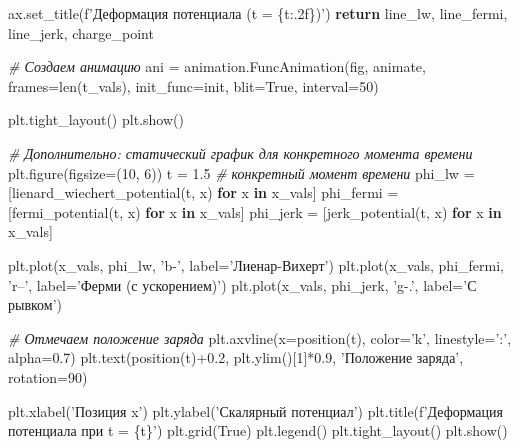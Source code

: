 \documentclass[11pt]{article}
\newenvironment{Shaded}{}{}
\newcommand{\KeywordTok}[1]{\textcolor[rgb]{0.00,0.44,0.13}{\textbf{{#1}}}}
\newcommand{\DecValTok}[1]{\textcolor[rgb]{0.25,0.63,0.44}{{#1}}}
\newcommand{\FloatTok}[1]{\textcolor[rgb]{0.25,0.63,0.44}{{#1}}}
\newcommand{\StringTok}[1]{\textcolor[rgb]{0.25,0.44,0.63}{{#1}}}
\newcommand{\CommentTok}[1]{\textcolor[rgb]{0.38,0.63,0.69}{\textit{{#1}}}}
\newcommand{\NormalTok}[1]{{#1}}
\newcommand{\SpecialCharTok}[1]{\textcolor[rgb]{0.25,0.44,0.63}{{#1}}}
\newcommand{\SpecialStringTok}[1]{\textcolor[rgb]{0.73,0.40,0.53}{{#1}}}
\newcommand{\VariableTok}[1]{\textcolor[rgb]{0.10,0.09,0.49}{{#1}}}
\newcommand{\ControlFlowTok}[1]{\textcolor[rgb]{0.00,0.44,0.13}{\textbf{{#1}}}}
\newcommand{\OperatorTok}[1]{\textcolor[rgb]{0.40,0.40,0.40}{{#1}}}
\newcommand{\BuiltInTok}[1]{{#1}}
\begin{document}
\begin{Shaded}
\begin{Highlighting}[]
\NormalTok{    ax.set_title(}\SpecialStringTok{f'Деформация потенциала (t = }\SpecialCharTok{\{t:.2f\}}\SpecialStringTok{)'}\NormalTok{)}
    \ControlFlowTok{return}\NormalTok{ line_lw, line_fermi, line_jerk, charge_point}

\CommentTok{# Создаем анимацию}
\NormalTok{ani }\OperatorTok{=}\NormalTok{ animation.FuncAnimation(fig, animate, frames}\OperatorTok{=}\BuiltInTok{len}\NormalTok{(t_vals),}
\NormalTok{                             init_func}\OperatorTok{=}\NormalTok{init, blit}\OperatorTok{=}\VariableTok{True}\NormalTok{, interval}\OperatorTok{=}\DecValTok{50}\NormalTok{)}

\NormalTok{plt.tight_layout()}
\NormalTok{plt.show()}

\CommentTok{# Дополнительно: статический график для конкретного момента времени}
\NormalTok{plt.figure(figsize}\OperatorTok{=}\NormalTok{(}\DecValTok{10}\NormalTok{, }\DecValTok{6}\NormalTok{))}
\NormalTok{t }\OperatorTok{=} \FloatTok{1.5}  \CommentTok{# конкретный момент времени}
\NormalTok{phi_lw }\OperatorTok{=}\NormalTok{ [lienard_wiechert_potential(t, x) }\ControlFlowTok{for}\NormalTok{ x }\KeywordTok{in}\NormalTok{ x_vals]}
\NormalTok{phi_fermi }\OperatorTok{=}\NormalTok{ [fermi_potential(t, x) }\ControlFlowTok{for}\NormalTok{ x }\KeywordTok{in}\NormalTok{ x_vals]}
\NormalTok{phi_jerk }\OperatorTok{=}\NormalTok{ [jerk_potential(t, x) }\ControlFlowTok{for}\NormalTok{ x }\KeywordTok{in}\NormalTok{ x_vals]}

\NormalTok{plt.plot(x_vals, phi_lw, }\StringTok{'b-'}\NormalTok{, label}\OperatorTok{=}\StringTok{'Лиенар-Вихерт'}\NormalTok{)}
\NormalTok{plt.plot(x_vals, phi_fermi, }\StringTok{'r--'}\NormalTok{, label}\OperatorTok{=}\StringTok{'Ферми (с ускорением)'}\NormalTok{)}
\NormalTok{plt.plot(x_vals, phi_jerk, }\StringTok{'g-.'}\NormalTok{, label}\OperatorTok{=}\StringTok{'С рывком'}\NormalTok{)}

\CommentTok{# Отмечаем положение заряда}
\NormalTok{plt.axvline(x}\OperatorTok{=}\NormalTok{position(t), color}\OperatorTok{=}\StringTok{'k'}\NormalTok{, linestyle}\OperatorTok{=}\StringTok{':'}\NormalTok{, alpha}\OperatorTok{=}\FloatTok{0.7}\NormalTok{)}
\NormalTok{plt.text(position(t)}\OperatorTok{+}\FloatTok{0.2}\NormalTok{, plt.ylim()[}\DecValTok{1}\NormalTok{]}\OperatorTok{*}\FloatTok{0.9}\NormalTok{, }\StringTok{'Положение заряда'}\NormalTok{, rotation}\OperatorTok{=}\DecValTok{90}\NormalTok{)}

\NormalTok{plt.xlabel(}\StringTok{'Позиция x'}\NormalTok{)}
\NormalTok{plt.ylabel(}\StringTok{'Скалярный потенциал'}\NormalTok{)}
\NormalTok{plt.title(}\SpecialStringTok{f'Деформация потенциала при t = }\SpecialCharTok{\{t\}}\SpecialStringTok{'}\NormalTok{)}
\NormalTok{plt.grid(}\VariableTok{True}\NormalTok{)}
\NormalTok{plt.legend()}
\NormalTok{plt.tight_layout()}
\NormalTok{plt.show()}
\end{Highlighting}
\end{Shaded}
\end{document}
